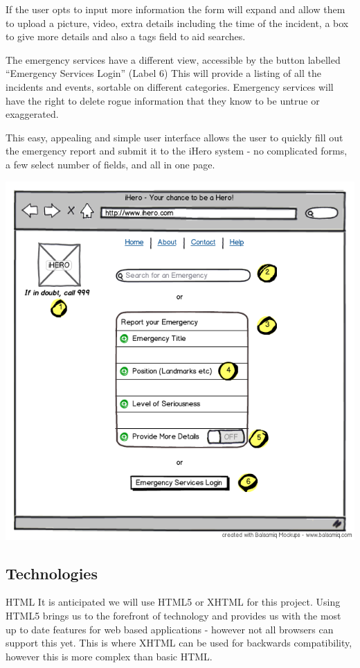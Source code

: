 \documentclass{sig-alt-release2}
\begin{document}
If the user opts to input more information the form will expand and allow them to upload a picture, video, extra details including the time of the incident, a box to give more details and also a tags field to aid searches.

The emergency services have a different view, accessible by the button labelled “Emergency Services Login” (Label 6) This will provide a listing of all the incidents and events, sortable on different categories. Emergency services will have the right to delete rogue information that they know to be untrue or exaggerated.

This easy, appealing and simple user interface allows the user to quickly fill out the emergency report and submit it to the iHero system - no complicated forms, a few select number of fields, and all in one page.

\begin{center}
\includegraphics[scale=0.4]{img/1.png}
\end{center}

\subsection{Technologies}

HTML
It is anticipated we will use HTML5 or XHTML for this project. Using HTML5 brings us to the forefront of technology and provides us with the most up to date features for web based applications - however not all browsers can support this yet. This is where XHTML can be used for backwards compatibility, however this is more complex than basic HTML.
\end{document}
